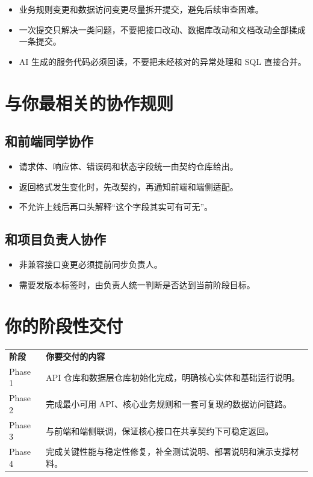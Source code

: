 \documentclass[11pt,a4paper]{ctexart}
\begin{document}
\begin{itemize}
  \item 业务规则变更和数据访问变更尽量拆开提交，避免后续审查困难。
  \item 一次提交只解决一类问题，不要把接口改动、数据库改动和文档改动全部揉成一条提交。
  \item AI 生成的服务代码必须回读，不要把未经核对的异常处理和 SQL 直接合并。
\end{itemize}

\section{与你最相关的协作规则}

\subsection{和前端同学协作}

\begin{itemize}
  \item 请求体、响应体、错误码和状态字段统一由契约仓库给出。
  \item 返回格式发生变化时，先改契约，再通知前端和端侧适配。
  \item 不允许上线后再口头解释“这个字段其实可有可无”。
\end{itemize}

\subsection{和项目负责人协作}

\begin{itemize}
  \item 非兼容接口变更必须提前同步负责人。
  \item 需要发版本标签时，由负责人统一判断是否达到当前阶段目标。
\end{itemize}

\section{你的阶段性交付}

\begin{longtable}{>{\raggedright\arraybackslash}p{} >{\raggedright\arraybackslash}p{}}
\textbf{阶段} & \textbf{你要交付的内容} \\
Phase 1 & API 仓库和数据层仓库初始化完成，明确核心实体和基础运行说明。 \\
Phase 2 & 完成最小可用 API、核心业务规则和一套可复现的数据访问链路。 \\
Phase 3 & 与前端和端侧联调，保证核心接口在共享契约下可稳定返回。 \\
Phase 4 & 完成关键性能与稳定性修复，补全测试说明、部署说明和演示支撑材料。 \\
\end{longtable}
\end{document}
